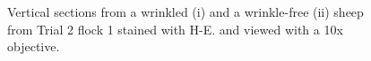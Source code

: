 %

\begin{figure}[p]
\centering
  \caption{Vertical sections from a wrinkled (i) and a wrinkle-free (ii)  sheep from Trial 2 flock 1 stained with H-E. and viewed with a 10x objective. }
\vfill
  \label{fig:he10x}
\end{figure}

%

